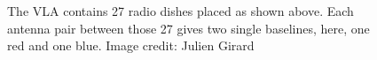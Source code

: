 \begin{figure}[ht]
\centering
{}
\caption{\label{fig.vla.uvcoverage} The VLA contains 27 radio dishes placed as shown above. Each antenna pair between those 27 gives two single baselines, here, one red and one blue. Image credit: Julien Girard}
\end{figure}


